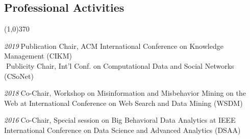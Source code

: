\documentclass[10pt]{article}
\newenvironment{myindentpar}[1]%
{\begin{list}{}%
         {\setlength{\leftmargin}{#1}}%
         \item[]%
}
{\end{list}}
\newcounter{list}
\begin{document}
\subsection{\sc Professional Activities}
\vspace{-0.4cm} \line(1,0){370} \vspace{-0.1cm}

\begin{myindentpar}{0.75cm}


\hspace{-0.75cm}{\bf Organizing Committee}

{\small

\hspace{-0.75cm}\emph{2019}\textcolor{white}{.}Publication Chair, ACM International Conference on Knowledge Management (CIKM) \\
\textcolor{white}{.}Publicity Chair, Int'l Conf. on Computational Data and Social Networks (CSoNet)

\hspace{-0.75cm}\emph{2018}\textcolor{white}{.}Co-Chair, Workshop on Misinformation and Misbehavior Mining on the Web at International Conference on Web Search and Data Mining (WSDM)

\hspace{-0.75cm}\emph{2016}\textcolor{white}{.}Co-Chair, Special session on Big Behavioral Data Analytics at IEEE International Conference on Data Science and Advanced Analytics (DSAA)

}


\hspace{-0.75cm}{\bf Program Committee}

{\small

}
\end{myindentpar}
\end{document}
